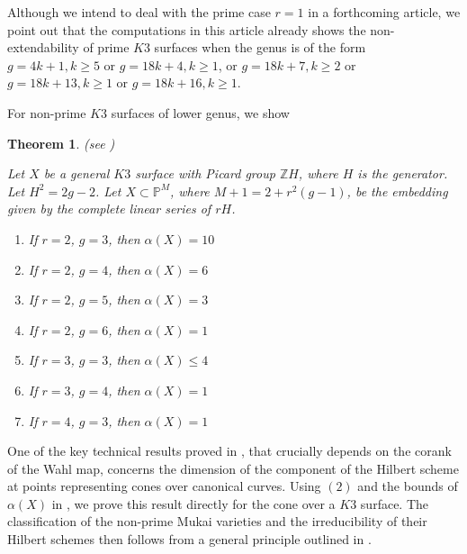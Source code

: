 \documentclass[11pt,twoside]{amsart}
\theoremstyle{plain}
\numberwithin{equation}{section}
\newtheorem{theorem}{Theorem}[section]
\theoremstyle{definition}
\begin{document}
 \par


Although we intend to deal with the prime case $r=1$ in a forthcoming article, we point out that the computations in this article already shows the non-extendability of prime $K3$ surfaces when the genus is of the form $g = 4k+1, k \geq 5$ or $g = 18k+4, k \geq 1$, or $g = 18k+7, k \geq 2$ or $g = 18k+13, k \geq 1$ or $g = 18k+16, k \geq 1$.
\vspace{0.2cm}

For non-prime $K3$ surfaces of lower genus, we show 

\begin{theorem}(see )\label{ZL for lower genus $K3$ surfaces intro}

Let $X$ be a general $K3$ surface with Picard group $\mathbb{Z}H$, where $H$ is the generator. Let $H^2 = 2g-2$. Let $X \subset \mathbb{P}^M$, where $M+1 = 2+r^2(g-1)$, be the embedding given by the complete linear series of $rH$. 
    \begin{enumerate}
        \item If $r = 2$, $g = 3$, then $\alpha(X) = 10$ 
        \item If $r = 2$, $g = 4$, then $\alpha(X) = 6$ 
        \item If $r = 2$, $g = 5$, then $\alpha(X) = 3$ 
        \item If $r = 2$, $g = 6$, then $\alpha(X) = 1$ 
        \item If $r = 3$, $g = 3$, then $\alpha(X) \leq 4$
        \item If $r = 3$, $g = 4$, then $\alpha(X) = 1$ 
        \item If $r = 4$, $g = 3$, then $\alpha(X) = 1$
        
       
        
    \end{enumerate}
    
\end{theorem}

One of the key technical results proved in \cite{CLM98}, that crucially depends on the corank of the Wahl map, concerns the dimension of the component of the Hilbert scheme at points representing cones over canonical curves. Using  $(2)$ and the bounds of $\alpha(X)$ in , we prove this result directly for the cone over a $K3$ surface. 
The classification of the non-prime Mukai varieties and the irreducibility of their Hilbert schemes then follows from a general principle outlined in \cite{CLM98}. 
\end{document}
